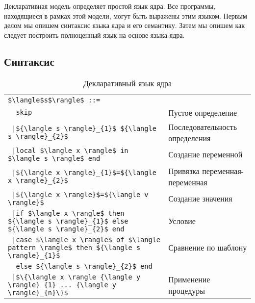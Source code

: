 Декларативная модель определяет простой язык ядра. Все программы, находящиеся в рамках этой модели, могут быть выражены этим языком. Первым делом мы опишем синтаксис языка ядра и его семантику. Затем мы опишем как следует построить полноценный язык на основе языка ядра.

\subsection{Синтаксис}

\begin{table}

  \begin{tabular}{|ll|}
    \hline
    \lstinline|$\langle$s$\rangle$ ::=| & \\
    \lstinline|  skip| & Пустое определение\\
    \lstinline! |${\langle s \rangle}_{1}$ ${\langle s \rangle}_{2}$! & Последовательность определения\\
    \lstinline! |local $\langle x \rangle$ in $\langle s \rangle$ end! & Создание переменной\\
    \lstinline! |${\langle x \rangle}_{1}$=${\langle x \rangle}_{2}$! & Привязка переменная-переменная\\
    \lstinline! |${\langle x \rangle}$=${\langle v \rangle}$! & Создание значения\\
    \lstinline! |if $\langle x \rangle$ then ${\langle s \rangle}_{1}$ else ${\langle s \rangle}_{2}$ end! & Условие\\
    \lstinline! |case $\langle x \rangle$ of $\langle pattern \rangle$ then ${\langle s \rangle}_{1}$! & Сравнение по шаблону\\
    \lstinline!  else ${\langle s \rangle}_{2}$ end! & \\
    \lstinline! |$\{\langle x \rangle {\langle y \rangle}_{1} ... {\langle y \rangle}_{n}\}$! & Применение процедуры\\
    \hline
  \end{tabular}
  
\caption{Декларативный язык ядра}
\label{table:the_declarative_kernel_language}
\end{table}

